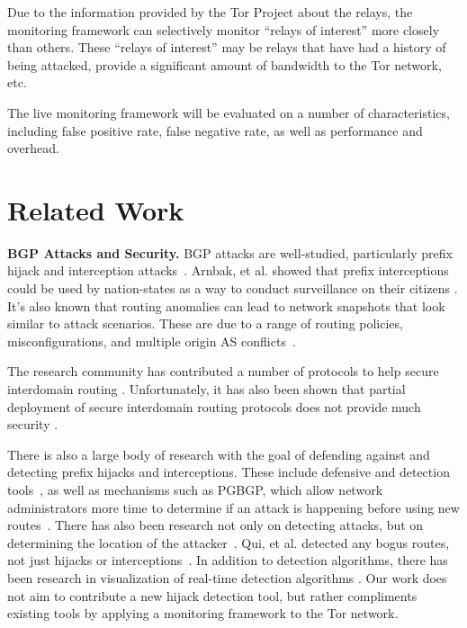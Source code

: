 \documentclass{acm_proc_article-sp}
\begin{document}
Due to the information provided by the Tor Project about the relays, the monitoring framework can selectively monitor ``relays of interest'' more closely than others.  These ``relays of interest'' may be relays that have had a history of being attacked, provide a significant amount of bandwidth to the Tor network, etc.

The live monitoring framework will be evaluated on a number of characteristics, including false positive rate, false negative rate, as well as performance and overhead.

\section{Related Work}

{\bf BGP Attacks and Security.}
BGP attacks are well-studied, particularly prefix hijack and interception attacks~\cite{ballani2007study, mcarthur2009stealthy, zhang2012studying}.  Arnbak, et al. showed that prefix interceptions could be used by nation-states as a way to conduct surveillance on their citizens \cite{arnbak2014loopholes}.  It's also known that routing anomalies can lead to network snapshots that look similar to attack scenarios.  These are due to a range of routing policies, misconfigurations, and multiple origin AS conflicts~\cite{caesar2005bgp, mahajan2002understanding, zhao2001analysis}.  

The research community has contributed a number of protocols to help secure interdomain routing \cite{boldyreva2012provable, chan2006modeling, gill2011let, hu2004spv, zhang2009hc, van2007interdomain}.  Unfortunately, it has also been shown that partial deployment of secure interdomain routing protocols does not provide much security \cite{lychev2013bgp}.

There is also a large body of research with the goal of defending against and detecting prefix hijacks and interceptions.  These include defensive and detection tools~\cite{lad2006phas, hu2007accurate, shi2012detecting, zhang2008ispy, zheng2007light, sriram2009comparative, zhang2007practical}, as well as mechanisms such as PGBGP, which allow network administrators more time to determine if an attack is happening before using new routes~\cite{karlin2006pretty}.  There has also been research not only on detecting attacks, but on determining the location of the attacker~\cite{qiu2009locating}.  Qui, et al. detected any bogus routes, not just hijacks or interceptions~\cite{qiu2007detecting}.  In addition to detection algorithms, there has been research in visualization of real-time detection algorithms \cite{teoh2006bgp}.  Our work does not aim to contribute a new hijack detection tool, but rather compliments existing tools by applying a monitoring framework to the Tor network.  
\end{document}
